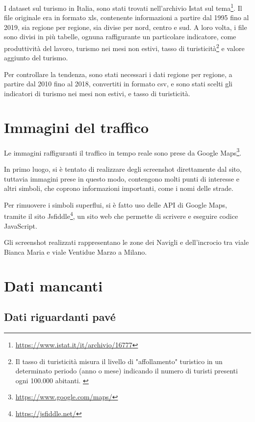 \documentclass[a4paper,12pt]{report}
\begin{document}
I dataset sul turismo in Italia, sono stati trovati nell'archivio Istat sul 
tema\footnote{\url{https://www.istat.it/it/archivio/16777}}. 
Il file originale era in formato xls, contenente informazioni a partire dal 1995 
fino al 2019, sia regione per regione, sia divise per nord, centro e sud. 
A loro volta, i file sono divisi in più tabelle, ognuna raffigurante un particolare 
indicatore, come produttività del lavoro, turismo nei mesi non estivi, 
tasso di turisticità\footnote{Il tasso di turisticità misura il livello di "affollamento" 
turistico in un determinato periodo (anno o mese) indicando il numero di turisti presenti 
ogni 100.000 abitanti. \cite{ONTIT:1}} 
e valore aggiunto del turismo. 

Per controllare la tendenza, sono stati necessari i dati regione per regione, 
a partire dal 2010 fino al 2018, convertiti in formato csv, e sono stati scelti gli 
indicatori di turismo nei mesi non estivi, e tasso di turisticità. 

\section{Immagini del traffico}

Le immagini raffiguranti il traffico in tempo reale sono prese da Google 
Maps\footnote{\url{https://www.google.com/maps/}}. 

In primo luogo, si è tentato di realizzare degli screenshot direttamente dal sito, 
tuttavia immagini prese in questo modo, contengono molti punti di interesse e altri simboli, 
che coprono informazioni importanti, come i nomi delle strade. 

Per rimuovere i simboli superflui, si è fatto uso delle API di Google Maps, 
tramite il sito Jsfiddle\footnote{\url{https://jsfiddle.net/}}, un sito web che permette di 
scrivere e eseguire codice JavaScript. 

Gli screenshot realizzati rappresentano le zone dei Navigli e dell'incrocio tra viale 
Bianca Maria e viale Ventidue Marzo a Milano. 

\section{Dati mancanti}

\subsection{Dati riguardanti pavé}
\end{document}
